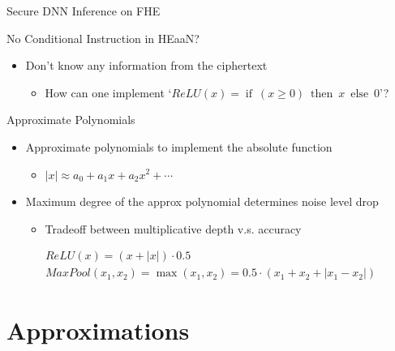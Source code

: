 \documentclass[9pt]{beamer}
\begin{document}
\begin{frame}{Secure DNN Inference on FHE}
    \begin{block}{No Conditional Instruction in HEaaN?}
        \begin{itemize}
            \item Don't know any information from the ciphertext
                  \begin{itemize}
                      \item How can one implement `$ReLU(x) = \operatorname{if}\:(x\geq 0)\:\operatorname{then}\:x\:\operatorname{else}\:0$'?
                  \end{itemize}
        \end{itemize}
    \end{block}
    \begin{alertblock}{Approximate Polynomials}
        \begin{itemize}
            \item Approximate polynomials to implement \alert{the absolute function}
                  \begin{itemize}
                      \item $|x| \approx a_0 + a_1 x + a_2 x^2 + \cdots$
                  \end{itemize}
            \item Maximum degree of the approx polynomial determines noise level drop
                  \begin{itemize}
                      \item \alert{Tradeoff between multiplicative depth v.s. accuracy}
                  \end{itemize}
        \end{itemize}
    \end{alertblock}
    \begin{gather*}
        ReLU(x) = (x + |x|) \cdot 0.5 \\
        MaxPool(x_1, x_2) = \max(x_1, x_2) = 0.5 \cdot (x_1 + x_2 + |x_1 - x_2|)
    \end{gather*}
\end{frame}

\section{Approximations}
\end{document}
